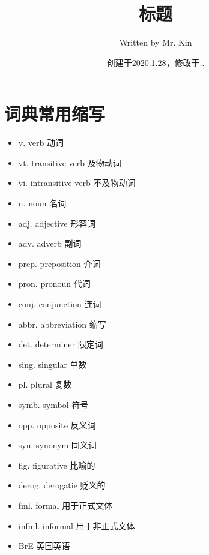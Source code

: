 \documentclass[11pt,a4paper,UTF8,titlepage]{ctexrep} %
\title{\hypertarget{title}{\textbf{标题}}}
\author{Written by Mr. Kin}
\date{创建于2020.1.28，修改于\number\year.\number\month.\number\day}
\makeatletter
\renewcommand{\tableofcontents}%
  {\chapter{\contentsname}%
  \@mkboth{\MakeUppercase\contentsname}{\MakeUppercase\contentsname}%
  \@makeschapterhead{\sourcecodename}%
  \@starttoc{toc}%
}
\makeatother
\begin{document}
    \maketitle %
    {\centering \tableofcontents} %
    \clearpage %
    \fi

    \chapter*{词典常用缩写}
    \begin{multicols}{2}
        \begin{itemize}[left=0em]
            \item v. verb 动词
            \item vt. transitive verb 及物动词
            \item vi. intransitive verb 不及物动词
            \item n. noun 名词
            \item adj. adjective 形容词
            \item adv. adverb 副词
            \item prep. preposition 介词
            \item pron. pronoun 代词
            \item conj. conjunction 连词
            \item abbr. abbreviation 缩写
            \item det. determiner 限定词
            \item sing. singular 单数
            \item pl. plural 复数
            \item symb. symbol 符号
            \item opp. opposite 反义词
            \item syn. synonym 同义词
            \item fig. figurative 比喻的
            \item derog. derogatie 贬义的
            \item fml. formal 用于正式文体
            \item infml. informal 用于非正式文体
            \item BrE 英国英语

\end{itemize}
\end{multicols}
\end{document}
